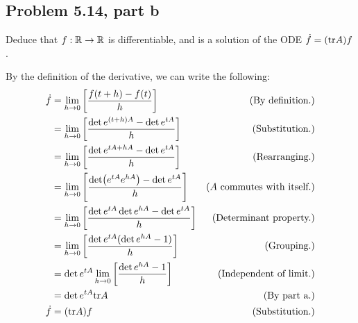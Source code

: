 \subsection{Problem 5.14, part b}
Deduce that $f: \mathbb{R} \rightarrow \mathbb{R}$ is differentiable, and is a solution of the ODE $\Dot{f} = (\text{tr} A)f$.
\partbreak
\begin{solution}

    By the definition of the derivative, we can write the following:
    \tightalignbreak
    \begin{align*}
        \Dot{f} &= \lim_{h \rightarrow 0} \left [\frac{f(t+h) - f(t)}{h} \right ] &\text{(By definition.)}\\
        &= \lim_{h \rightarrow 0} \left [\frac{\det e^{(t+h)A} - \det e^{tA}}{h} \right ] &\text{(Substitution.)}\\
        &= \lim_{h \rightarrow 0} \left [\frac{\det e^{tA + hA} - \det e^{tA}}{h} \right ] &\text{(Rearranging.)}\\
        &= \lim_{h \rightarrow 0} \left [\frac{\det (e^{tA}e^{hA}) - \det e^{tA}}{h} \right ] &\text{($A$ commutes with itself.)}\\
        &= \lim_{h \rightarrow 0} \left [\frac{\det e^{tA} \det e^{hA} - \det e^{tA}}{h} \right ] &\text{(Determinant property.)}\\
        &= \lim_{h \rightarrow 0} \left [\frac{ \det e^{tA}(\det e^{hA} - 1)}{h} \right ] &\text{(Grouping.)}\\
        &= \det e^{tA} \lim_{h \rightarrow 0} \left [\frac{ \det e^{hA} - 1}{h} \right ] &\text{(Independent of limit.)}\\
        &= \det e^{tA} \text{tr} A &\text{(By part a.)}\\
        \Dot {f} &= (\text{tr} A)f  &\text{(Substitution.)}
    \end{align*}
    \vspace{-6mm}\alignbreak
\end{solution}

\newpage
